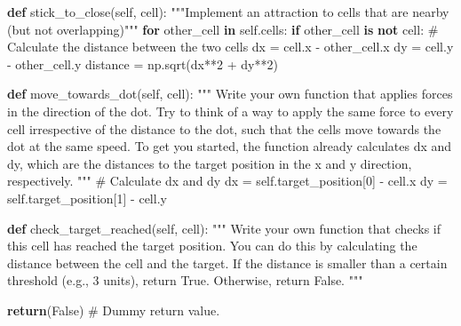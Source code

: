 \documentclass[
  letterpaper,
  DIV=11,
  numbers=noendperiod]{scrreprt}
\newenvironment{Shaded}{\begin{snugshade}}{\end{snugshade}}
\newcommand{\CommentTok}[1]{\textcolor[rgb]{0.37,0.37,0.37}{#1}}
\newcommand{\ControlFlowTok}[1]{\textcolor[rgb]{0.00,0.23,0.31}{\textbf{#1}}}
\newcommand{\DecValTok}[1]{\textcolor[rgb]{0.68,0.00,0.00}{#1}}
\newcommand{\KeywordTok}[1]{\textcolor[rgb]{0.00,0.23,0.31}{\textbf{#1}}}
\newcommand{\NormalTok}[1]{\textcolor[rgb]{0.00,0.23,0.31}{#1}}
\newcommand{\OperatorTok}[1]{\textcolor[rgb]{0.37,0.37,0.37}{#1}}
\newcommand{\VariableTok}[1]{\textcolor[rgb]{0.07,0.07,0.07}{#1}}
\theoremstyle{definition}
\theoremstyle{remark}
\begin{document}
\begin{tcolorbox}
\begin{Shaded}
\begin{Highlighting}[]
                    
    \KeywordTok{def}\NormalTok{ stick\_to\_close(}\VariableTok{self}\NormalTok{, cell):}
        \CommentTok{"""Implement an attraction to cells that are nearby (but not overlapping)"""}
        \ControlFlowTok{for}\NormalTok{ other\_cell }\KeywordTok{in} \VariableTok{self}\NormalTok{.cells:}
            \ControlFlowTok{if}\NormalTok{ other\_cell }\KeywordTok{is} \KeywordTok{not}\NormalTok{ cell:}
                \CommentTok{\# Calculate the distance between the two cells}
\NormalTok{                dx }\OperatorTok{=}\NormalTok{ cell.x }\OperatorTok{{-}}\NormalTok{ other\_cell.x}
\NormalTok{                dy }\OperatorTok{=}\NormalTok{ cell.y }\OperatorTok{{-}}\NormalTok{ other\_cell.y}
\NormalTok{                distance }\OperatorTok{=}\NormalTok{ np.sqrt(dx}\OperatorTok{**}\DecValTok{2} \OperatorTok{+}\NormalTok{ dy}\OperatorTok{**}\DecValTok{2}\NormalTok{)}

    
    \KeywordTok{def}\NormalTok{ move\_towards\_dot(}\VariableTok{self}\NormalTok{, cell):}
        \CommentTok{"""}
\CommentTok{        Write your own function that applies forces in the direction of the dot.}
\CommentTok{        Try to think of a way to apply the same force to every cell irrespective}
\CommentTok{        of the distance to the dot, such that the cells move towards the dot at }
\CommentTok{        the same speed. }
\CommentTok{        }
\CommentTok{        To get you started, the function already calculates dx and dy, which are}
\CommentTok{        the distances to the target position in the x and y direction, respectively.}
\CommentTok{        """}
        \CommentTok{\# Calculate dx and dy}
\NormalTok{        dx }\OperatorTok{=} \VariableTok{self}\NormalTok{.target\_position[}\DecValTok{0}\NormalTok{] }\OperatorTok{{-}}\NormalTok{ cell.x}
\NormalTok{        dy }\OperatorTok{=} \VariableTok{self}\NormalTok{.target\_position[}\DecValTok{1}\NormalTok{] }\OperatorTok{{-}}\NormalTok{ cell.y}
        
    
    \KeywordTok{def}\NormalTok{ check\_target\_reached(}\VariableTok{self}\NormalTok{, cell):}
        \CommentTok{"""}
\CommentTok{        Write your own function that checks if this cell has reached the target position.}
\CommentTok{        You can do this by calculating the distance between the cell and the target.}
\CommentTok{        If the distance is smaller than a certain threshold (e.g., 3 units), return True.}
\CommentTok{        Otherwise, return False.}
\CommentTok{        """}
        
        \ControlFlowTok{return}\NormalTok{(}\VariableTok{False}\NormalTok{)  }\CommentTok{\# Dummy \textquotesingle{}return\textquotesingle{} value. }
    

\end{Highlighting}
\end{Shaded}
\end{tcolorbox}
\end{document}
